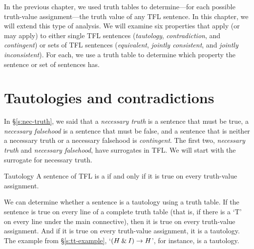 

In the previous chapter, we used truth tables to determine---for each possible truth-value assignment---the truth value of any TFL sentence. In this chapter, we will extend this type of analysis. We will examine six properties that apply (or may apply) to either single TFL sentences (\textit{tautology}, \textit{contradiction}, and \textit{contingent}) or sets of TFL sentences (\textit{equivalent}, \textit{jointly consistent}, and \textit{jointly inconsistent}). For each, we use a truth table to determine which property the sentence or set of sentences has.


\section{Tautologies and contradictions}
In \S\ref{s:nec-truth}, we said that a \emph{necessary truth} is a sentence that must be true, a \emph{necessary falsehood} is a sentence that must be false, and a sentence that is neither a necessary truth or a necessary falsehood is \textit{contingent}. The first two, \textit{necessary truth} and \textit{necessary falsehood}, have surrogates in TFL. We will start with the surrogate for necessary truth.

\begin{factboxy}{Tautology}
A sentence of TFL is a  if and only if it is true on every truth-value assignment.
\end{factboxy}

We can determine whether a sentence is a tautology using a truth table. If the sentence is true on every line of a complete truth table (that is, if there is a `T' on every line under the main connective), then it is true on every truth-value assignment. And if it is true on every truth-value assignment, it is a tautology. The example from \S\ref{s:tt-example}, `$(H \mathbin{\&} I) \rightarrow H$', for instance, is a tautology. 

